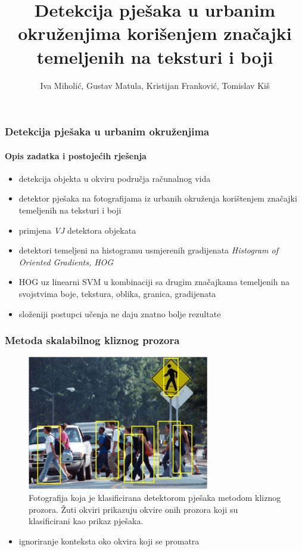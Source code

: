 \documentclass{beamer}
\title{Detekcija pješaka u urbanim okruženjima korišenjem značajki temeljenih na teksturi i boji}
\author{Iva Miholić, Gustav Matula, Kristijan Franković, Tomislav Kiš}
\begin{document}
\begin{frame}
\maketitle
\end{frame}

\begin{frame}
\frametitle{Detekcija pješaka u urbanim okruženjima}
\framesubtitle{Opis zadatka i postojećih rješenja}
\begin{itemize}
\item detekcija objekta u okviru područja računalnog vida
\item detektor pješaka na fotografijama iz urbanih okruženja korištenjem značajki temeljenih na teksturi i boji
\end{itemize}
\end{frame}

\begin{frame}
\begin{itemize}
\frametitle{Osnovni pregled postojećih rješenja}
\item primjena \emph{VJ} detektora objekata
\item detektori temeljeni na histogramu usmjerenih gradijenata \emph{Histogram of Oriented Gradients, HOG}
\item HOG uz linearni SVM u kombinaciji sa drugim značajkama temeljenih na svojstvima boje, tekstura, oblika, granica, gradijenata
\item složeniji postupci učenja ne daju znatno bolje rezultate
\end{itemize}
\end{frame}

\begin{frame}
\frametitle{Metoda skalabilnog kliznog prozora}

\begin{figure}
\center
\includegraphics[scale=0.7]{img/crossing.png}
\caption{Fotografija koja je klasificirana detektorom pješaka metodom kliznog prozora. Žuti okviri prikazuju okvire onih prozora koji su klasificirani kao prikaz pješaka.}
\label{primjer_klasifikacije}
\end{figure}
\begin{itemize}
\item ignoriranje konteksta oko okvira koji se promatra 
\end{itemize}
\end{frame}
\end{document}
